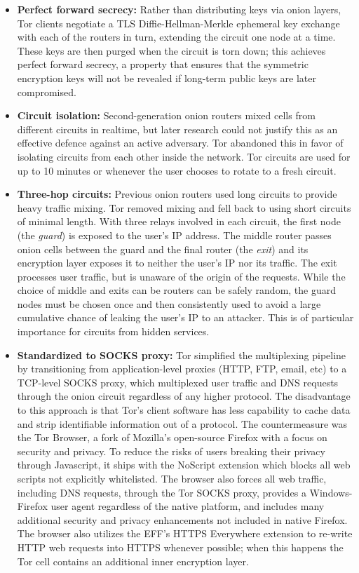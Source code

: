 \begin{itemize}
	\item \textbf{Perfect forward secrecy:} Rather than distributing keys via onion layers, Tor clients negotiate a TLS Diffie-Hellman-Merkle ephemeral key exchange with each of the routers in turn, extending the circuit one node at a time. These keys are then purged when the circuit is torn down; this achieves perfect forward secrecy, a property that ensures that the symmetric encryption keys will not be revealed if long-term public keys are later compromised.
	\item \textbf{Circuit isolation:} Second-generation onion routers mixed cells from different circuits in realtime, but later research could not justify this as an effective defence against an active adversary.\cite{syverson2011peel} Tor abandoned this in favor of isolating circuits from each other inside the network. Tor circuits are used for up to 10 minutes or whenever the user chooses to rotate to a fresh circuit.
	\item \textbf{Three-hop circuits:} Previous onion routers used long circuits to provide heavy traffic mixing. Tor removed mixing and fell back to using short circuits of minimal length. With three relays involved in each circuit, the first node (the \emph{guard}) is exposed to the user's IP address. The middle router passes onion cells between the guard and the final router (the \emph{exit}) and its encryption layer exposes it to neither the user's IP nor its traffic. The exit processes user traffic, but is unaware of the origin of the requests. While the choice of middle and exits can be routers can be safely random, the guard nodes must be chosen once and then consistently used to avoid a large cumulative chance of leaking the user's IP to an attacker. This is of particular importance for circuits from hidden services.\cite{bauer2007low}\cite{overlier2006locating}
	\item \textbf{Standardized to SOCKS proxy:} Tor simplified the multiplexing pipeline by transitioning from application-level proxies (HTTP, FTP, email, etc) to a TCP-level SOCKS proxy, which multiplexed user traffic and DNS requests through the onion circuit regardless of any higher protocol. The disadvantage to this approach is that Tor's client software has less capability to cache data and strip identifiable information out of a protocol. The countermeasure was the Tor Browser, a fork of Mozilla's open-source Firefox with a focus on security and privacy. To reduce the risks of users breaking their privacy through Javascript, it ships with the NoScript extension which blocks all web scripts not explicitly whitelisted. The browser also forces all web traffic, including DNS requests, through the Tor SOCKS proxy, provides a Windows-Firefox user agent regardless of the native platform, and includes many additional security and privacy enhancements not included in native Firefox. The browser also utilizes the EFF's HTTPS Everywhere extension to re-write HTTP web requests into HTTPS whenever possible; when this happens the Tor cell contains an additional inner encryption layer.

\end{itemize}
